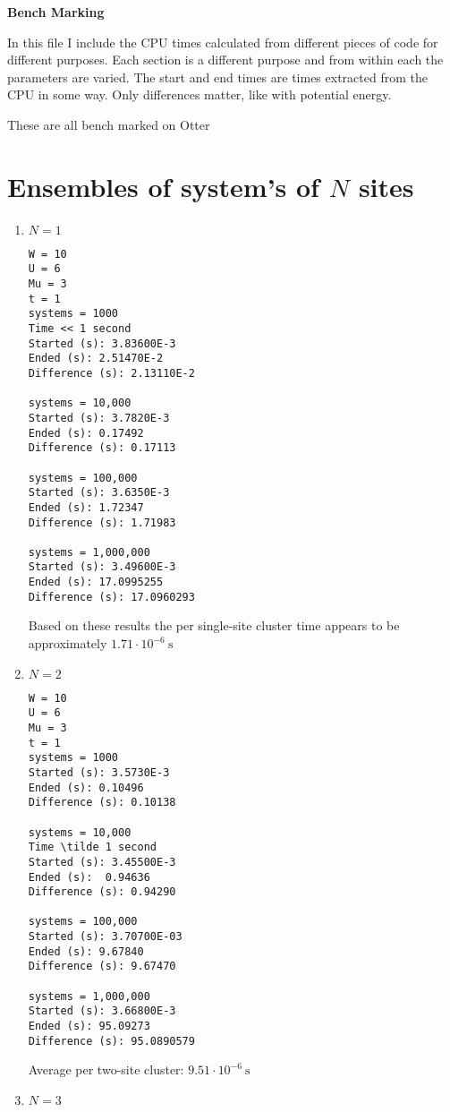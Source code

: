 \documentclass[12pt]{article}
\begin{document}
{\bf \Large Bench Marking}

In this file I include the CPU times calculated from different pieces of code for different purposes. Each section is a different purpose and from within each the parameters are varied. The start and end times are times extracted from the CPU in some way. Only differences matter, like with potential energy.

These are all bench marked on Otter
\section{ Ensembles of system's of $N$ sites}

\begin{enumerate}

\item $N = 1$

\begin{lstlisting}
W = 10
U = 6
Mu = 3
t = 1
systems = 1000
Time << 1 second
Started (s): 3.83600E-3
Ended (s): 2.51470E-2
Difference (s): 2.13110E-2

systems = 10,000
Started (s): 3.7820E-3
Ended (s): 0.17492
Difference (s): 0.17113

systems = 100,000
Started (s): 3.6350E-3
Ended (s): 1.72347
Difference (s): 1.71983

systems = 1,000,000
Started (s): 3.49600E-3
Ended (s): 17.0995255
Difference (s): 17.0960293
\end{lstlisting}

Based on these results the per single-site cluster time appears to be approximately $1.71\cdot 10^{-6}~\mbox{s}$

\item $N = 2$

\begin{lstlisting}
W = 10
U = 6
Mu = 3
t = 1
systems = 1000
Started (s): 3.5730E-3
Ended (s): 0.10496
Difference (s): 0.10138

systems = 10,000
Time \tilde 1 second
Started (s): 3.45500E-3
Ended (s):  0.94636
Difference (s): 0.94290

systems = 100,000
Started (s): 3.70700E-03
Ended (s): 9.67840
Difference (s): 9.67470

systems = 1,000,000
Started (s): 3.66800E-3
Ended (s): 95.09273
Difference (s): 95.0890579
\end{lstlisting}

Average per two-site cluster: $9.51\cdot 10^{-6}~\mbox{s}$

\item $N = 3$


\end{enumerate}
\end{document}
